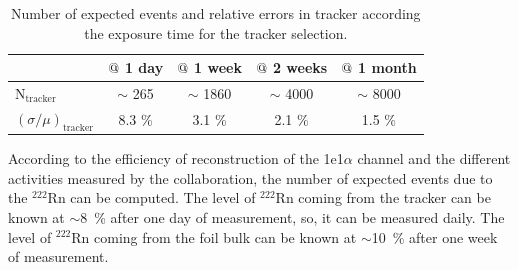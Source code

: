 \documentclass[main.tex]{subfiles}
\begin{document}
\begin{table}[h!]
\begin{center}
\begin{tabular}{l|c|c|c|c}
      & $\symbol{64}~$1 day  & $\symbol{64}~$1 week  & $\symbol{64}~$2 weeks & $\symbol{64}~$1 month  \\
\hline
$\text{N}_\text{tracker}$         & $\sim$ 265 & $\sim$ 1860 & $\sim$ 4000 & $\sim$ 8000 \\ 
$(\sigma / \mu)_{\text{tracker}}$ & 8.3 \%     & 3.1  \%     & 2.1  \%     & 1.5  \% \\
\hline
\end{tabular}
\end{center}
\caption{Number of expected events and relative errors in tracker according the exposure time for the tracker selection.}
\label{table_number_of_expected_events_relative_error_tracker_selection}
\end{table}


\bigskip
\FloatBarrier




\bigskip


\noindent According to the efficiency of reconstruction of the 1e1$\alpha$ channel and the different activities measured by the collaboration, the number of expected events due to the $^{\text{222}}$Rn can be computed. The level of $^{\text{222}}$Rn coming from the tracker can be known at $\sim$8~\% after one day of measurement, so, it can be measured daily. The level of $^{\text{222}}$Rn coming from the foil bulk can be known at $\sim$10~\% after one week of measurement.
\end{document}
